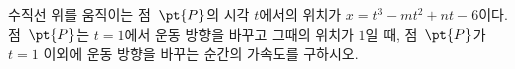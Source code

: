 수직선 위를 움직이는 점~$\pt{P}$의 시각 $t$에서의 위치가 $x=t^3-mt^2+nt-6$이다. 점~$\pt{P}$는 $t=1$에서 운동 방향을 바꾸고 그때의 위치가 $1$일 때, 점~$\pt{P}$가 $t=1$ 이외에 운동 방향을 바꾸는 순간의 가속도를 구하시오. 

